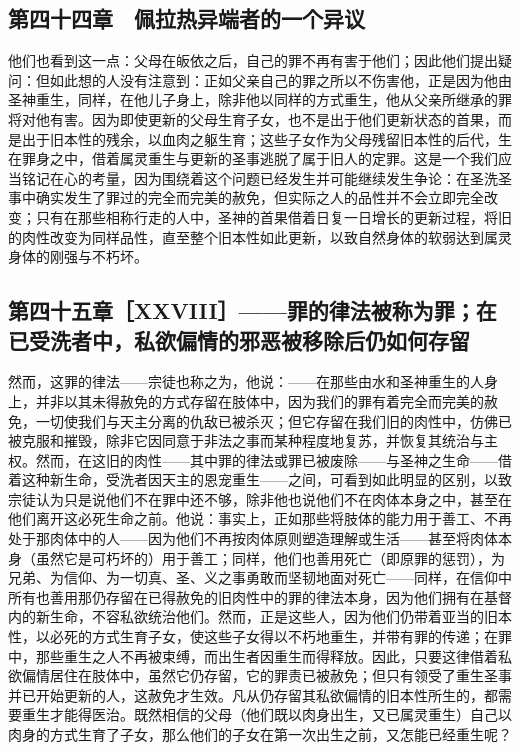 
\subsection{第四十四章　佩拉热异端者的一个异议}

他们也看到这一点：父母在皈依之后，自己的罪不再有害于他们；因此他们提出疑问：但如此想的人没有注意到：正如父亲自己的罪之所以不伤害他，正是因为他由圣神重生，同样，在他儿子身上，除非他以同样的方式重生，他从父亲所继承的罪将对他有害。因为即使更新的父母生育子女，也不是出于他们更新状态的首果，而是出于旧本性的残余，以血肉之躯生育；这些子女作为父母残留旧本性的后代，生在罪身之中，借着属灵重生与更新的圣事逃脱了属于旧人的定罪。这是一个我们应当铭记在心的考量，因为围绕着这个问题已经发生并可能继续发生争论：在圣洗圣事中确实发生了罪过的完全而完美的赦免，但实际之人的品性并不会立即完全改变；只有在那些相称行走的人中，圣神的首果借着日复一日增长的更新过程，将旧的肉性改变为同样品性，直至整个旧本性如此更新，以致自然身体的软弱达到属灵身体的刚强与不朽坏。\par


\subsection{第四十五章［XXVIII］——罪的律法被称为罪；在已受洗者中，私欲偏情的邪恶被移除后仍如何存留}

然而，这罪的律法——宗徒也称之为，他说：——在那些由水和圣神重生的人身上，并非以其未得赦免的方式存留在肢体中，因为我们的罪有着完全而完美的赦免，一切使我们与天主分离的仇敌已被杀灭；但它存留在我们旧的肉性中，仿佛已被克服和摧毁，除非它因同意于非法之事而某种程度地复苏，并恢复其统治与主权。然而，在这旧的肉性——其中罪的律法或罪已被废除——与圣神之生命——借着这种新生命，受洗者因天主的恩宠重生——之间，可看到如此明显的区别，以致宗徒认为只是说他们不在罪中还不够，除非他也说他们不在肉体本身之中，甚至在他们离开这必死生命之前。他说：事实上，正如那些将肢体的能力用于善工、不再处于那肉体中的人——因为他们不再按肉体原则塑造理解或生活——甚至将肉体本身（虽然它是可朽坏的）用于善工；同样，他们也善用死亡（即原罪的惩罚），为兄弟、为信仰、为一切真、圣、义之事勇敢而坚韧地面对死亡——同样，在信仰中所有也善用那仍存留在已得赦免的旧肉性中的罪的律法本身，因为他们拥有在基督内的新生命，不容私欲统治他们。然而，正是这些人，因为他们仍带着亚当的旧本性，以必死的方式生育子女，使这些子女得以不朽地重生，并带有罪的传递；在罪中，那些重生之人不再被束缚，而出生者因重生而得释放。因此，只要这律借着私欲偏情居住在肢体中，虽然它仍存留，它的罪责已被赦免；但只有领受了重生圣事并已开始更新的人，这赦免才生效。凡从仍存留其私欲偏情的旧本性所生的，都需要重生才能得医治。既然相信的父母（他们既以肉身出生，又已属灵重生）自己以肉身的方式生育了子女，那么他们的子女在第一次出生之前，又怎能已经重生呢？\par

